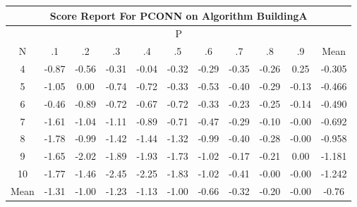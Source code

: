 \documentclass[11pt,a4paper]{report}
\begin{document}
\begin{longtable}{ | c || c | c | c | c | c | c | c | c | c || c |}
\hline
\multicolumn{11}{|c|}{ Score Report For PCONN on Algorithm BuildingA} \\
\hline
\multicolumn{11}{|c|}{ P } \\
\hline
N & .1 & .2 & .3 & .4 & .5 & .6 & .7 & .8 & .9 & Mean\\
 \hline
 \hline
 \endhead
  4 &  \cellcolor[HTML]{FFE7E7} -0.87 &  \cellcolor[HTML]{FFEFEF} -0.56 &  \cellcolor[HTML]{FFF7F7} -0.31 &  \cellcolor[HTML]{FFFFFF} -0.04 &  \cellcolor[HTML]{FFF7F7} -0.32 &  \cellcolor[HTML]{FFF7F7} -0.29 &  \cellcolor[HTML]{FFF7F7} -0.35 &  \cellcolor[HTML]{FFF7F7} -0.26 &  \cellcolor[HTML]{F7F7FF} 0.25 & -0.305 \\
  5 &  \cellcolor[HTML]{FFE7E7} -1.05 &  \cellcolor[HTML]{FFFFFF} 0.00 &  \cellcolor[HTML]{FFEFEF} -0.74 &  \cellcolor[HTML]{FFEFEF} -0.72 &  \cellcolor[HTML]{FFF7F7} -0.33 &  \cellcolor[HTML]{FFEFEF} -0.53 &  \cellcolor[HTML]{FFF7F7} -0.40 &  \cellcolor[HTML]{FFF7F7} -0.29 &  \cellcolor[HTML]{FFFFFF} -0.13 & -0.466 \\
  6 &  \cellcolor[HTML]{FFF7F7} -0.46 &  \cellcolor[HTML]{FFE7E7} -0.89 &  \cellcolor[HTML]{FFEFEF} -0.72 &  \cellcolor[HTML]{FFEFEF} -0.67 &  \cellcolor[HTML]{FFEFEF} -0.72 &  \cellcolor[HTML]{FFF7F7} -0.33 &  \cellcolor[HTML]{FFF7F7} -0.23 &  \cellcolor[HTML]{FFF7F7} -0.25 &  \cellcolor[HTML]{FFFFFF} -0.14 & -0.490 \\
  7 &  \cellcolor[HTML]{FFD7D7} -1.61 &  \cellcolor[HTML]{FFE7E7} -1.04 &  \cellcolor[HTML]{FFDFDF} -1.11 &  \cellcolor[HTML]{FFE7E7} -0.89 &  \cellcolor[HTML]{FFEFEF} -0.71 &  \cellcolor[HTML]{FFF7F7} -0.47 &  \cellcolor[HTML]{FFF7F7} -0.29 &  \cellcolor[HTML]{FFFFFF} -0.10 &  \cellcolor[HTML]{FFFFFF} -0.00 & -0.692 \\
  8 &  \cellcolor[HTML]{FFCFCF} -1.78 &  \cellcolor[HTML]{FFE7E7} -0.99 &  \cellcolor[HTML]{FFDFDF} -1.42 &  \cellcolor[HTML]{FFD7D7} -1.44 &  \cellcolor[HTML]{FFDFDF} -1.32 &  \cellcolor[HTML]{FFE7E7} -0.99 &  \cellcolor[HTML]{FFF7F7} -0.40 &  \cellcolor[HTML]{FFF7F7} -0.28 &  \cellcolor[HTML]{FFFFFF} -0.00 & -0.958 \\
  9 &  \cellcolor[HTML]{FFD7D7} -1.65 &  \cellcolor[HTML]{FFCFCF} -2.02 &  \cellcolor[HTML]{FFCFCF} -1.89 &  \cellcolor[HTML]{FFCFCF} -1.93 &  \cellcolor[HTML]{FFD7D7} -1.73 &  \cellcolor[HTML]{FFE7E7} -1.02 &  \cellcolor[HTML]{FFF7F7} -0.17 &  \cellcolor[HTML]{FFF7F7} -0.21 &  \cellcolor[HTML]{FFFFFF} 0.00 & -1.181 \\
  10 &  \cellcolor[HTML]{FFCFCF} -1.77 &  \cellcolor[HTML]{FFD7D7} -1.46 &  \cellcolor[HTML]{FFBFBF} -2.45 &  \cellcolor[HTML]{FFC7C7} -2.25 &  \cellcolor[HTML]{FFCFCF} -1.83 &  \cellcolor[HTML]{FFE7E7} -1.02 &  \cellcolor[HTML]{FFF7F7} -0.41 &  \cellcolor[HTML]{FFFFFF} -0.00 &  \cellcolor[HTML]{FFFFFF} -0.00 & -1.242 \\
 \hline
 \hline
Mean &  \cellcolor[HTML]{FFDFDF} -1.31 &  \cellcolor[HTML]{FFE7E7} -1.00 &  \cellcolor[HTML]{FFDFDF} -1.23 &  \cellcolor[HTML]{FFDFDF} -1.13 &  \cellcolor[HTML]{FFE7E7} -1.00 &  \cellcolor[HTML]{FFEFEF} -0.66 &  \cellcolor[HTML]{FFF7F7} -0.32 &  \cellcolor[HTML]{FFF7F7} -0.20 &  \cellcolor[HTML]{FFFFFF} -0.00 &  \cellcolor[HTML]{FFEFEF} -0.76
\end{longtable}
\end{document}
